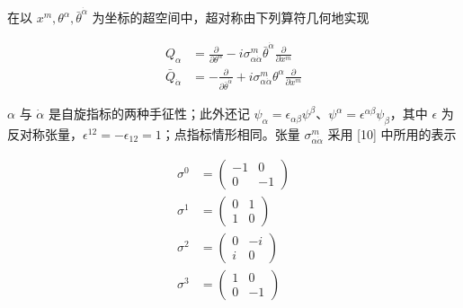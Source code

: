 在以 $x^m,\theta^\alpha,\bar\theta^{\dot\alpha}$ 为坐标的超空间中，超对称由下列算符几何地实现

\label{op:5}

\begin{equation}
\begin{aligned}
Q_\alpha &= \frac{\partial}{\partial\theta^\alpha} - i\sigma^m_{\alpha\dot\alpha}\bar\theta^{\dot\alpha}\frac{\partial}{\partial x^m}\\
\bar Q_{\dot\alpha} &= -\frac{\partial}{\partial\bar\theta^{\dot\alpha}} + i\sigma^m_{\alpha\dot\alpha}\theta^\alpha\frac{\partial}{\partial x^m}
\end{aligned}
\tag{2.1}
\end{equation}

$\alpha$ 与 $\dot\alpha$ 是自旋指标的两种手征性；此外还记 $\psi_\alpha=\epsilon_{\alpha\beta}\psi^\beta$、$\psi^\alpha=\epsilon^{\alpha\beta}\psi_\beta$，其中 $\epsilon$ 为反对称张量，$\epsilon^{12}=-\epsilon_{12}=1$；点指标情形相同。张量 $\sigma^m_{\alpha\dot\alpha}$ 采用 [10] 中所用的表示


\begin{equation}
\begin{aligned}
\sigma^0 &= \begin{pmatrix} -1 & 0 \\ 0 & -1 \end{pmatrix}\\
\sigma^1 &= \begin{pmatrix} 0 & 1 \\ 1 & 0 \end{pmatrix}\\
\sigma^2 &= \begin{pmatrix} 0 & -i \\ i & 0 \end{pmatrix}\\
\sigma^3 &= \begin{pmatrix} 1 & 0 \\ 0 & -1 \end{pmatrix}
\end{aligned}
\tag{2.2}
\end{equation}

